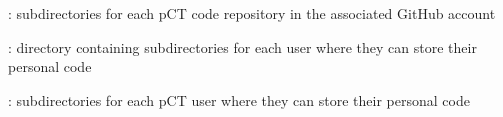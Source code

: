 \begin{tcbfunctionenv}
\begin{tcbparagraph}
\begin{deepList}[labelindent=1pt, leftmargin=*]
\begin{deepList}[labelindent=1pt, leftmargin=*]
\begin{deepList}[labelindent=1pt, leftmargin=*]
\begin{deepList}[labelindent=1pt, leftmargin=*]
\begin{deepList}[labelindent=1pt, leftmargin=*]
	        			\item {} : subdirectories for each pCT code repository in the associated GitHub account
	    			\end{deepList}
	    		\end{deepList}
			\item {} : directory containing subdirectories for each user where they can store their personal code
	    		\begin{deepList}[labelindent=1pt, leftmargin=*]
	        		\item {} : subdirectories for each pCT user where they can store their personal code
	    		\end{deepList}
		\end{deepList}			
    	\end{deepList}
\end{deepList}
\end{tcbparagraph}
\end{tcbfunctionenv}

